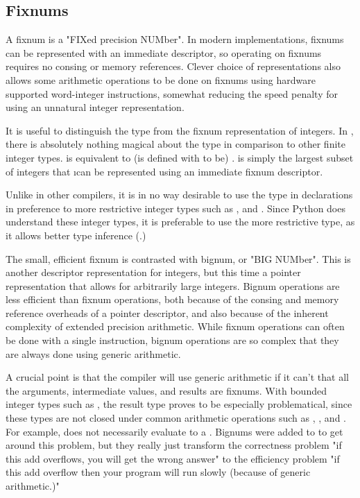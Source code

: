 {\subsection{Fixnums}
\label{fixnums}

A fixnum is a "FIXed precision NUMber".  In modern \llisp{} implementations,
fixnums can be represented with an immediate descriptor, so operating on
fixnums requires no consing or memory references.  Clever choice of
representations also allows some arithmetic operations to be done on fixnums
using hardware supported word-integer instructions, somewhat reducing the
speed penalty for using an unnatural integer representation.

It is useful to distinguish the  type from the fixnum representation
of integers.  In \python, there is absolutely nothing magical about the
 type in comparison to other finite integer types.   is
equivalent to (is defined with  to be) .
 is simply the largest subset of integers that \i{can be represented}
using an immediate fixnum descriptor.

Unlike in other \clisp{} compilers, it is in no way desirable to use the
 type in declarations in preference to more restrictive integer types
such as ,  and .  Since
Python does understand these integer types, it is preferable to use the more
restrictive type, as it allows better type inference (.)

The small, efficient fixnum is contrasted with bignum, or "BIG NUMber".  This
is another descriptor representation for integers, but this time a pointer
representation that allows for arbitrarily large integers.  Bignum operations
are less efficient than fixnum operations, both because of the consing and
memory reference overheads of a pointer descriptor, and also because of the
inherent complexity of extended precision arithmetic.  While fixnum operations
can often be done with a single instruction, bignum operations are so complex
that they are always done using generic arithmetic.

A crucial point is that the compiler will use generic arithmetic if
it can't  that all the arguments, intermediate values, and results are
fixnums.  With bounded integer types such as , the result type proves
to be especially problematical, since these types are not closed under
common arithmetic operations such as \code{+}, \code{-}, \code{*} and \code{/}.  For
example,  does not necessarily evaluate to a
.  Bignums were added to \llisp{} to get around this problem, but they
really just transform the correctness problem "if this add overflows, you will
get the wrong answer" to the efficiency problem "if this add  overflow
then your program will run slowly (because of generic arithmetic.)"

}
